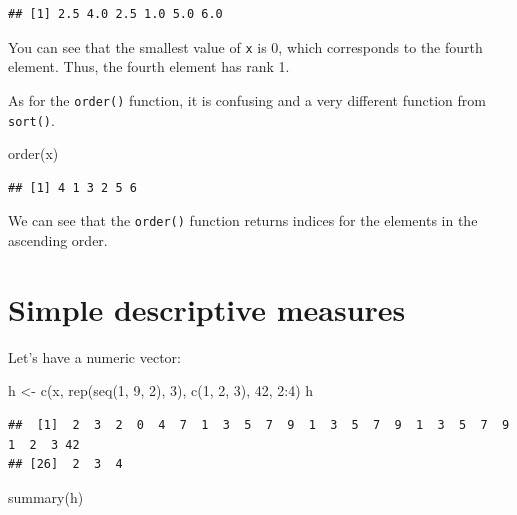 \documentclass[
]{book}
\newenvironment{Shaded}{\begin{snugshade}}{\end{snugshade}}
\newcommand{\DecValTok}[1]{\textcolor[rgb]{0.00,0.00,0.81}{#1}}
\newcommand{\FunctionTok}[1]{\textcolor[rgb]{0.00,0.00,0.00}{#1}}
\newcommand{\NormalTok}[1]{#1}
\newcommand{\OtherTok}[1]{\textcolor[rgb]{0.56,0.35,0.01}{#1}}
\newcommand{\SpecialCharTok}[1]{\textcolor[rgb]{0.00,0.00,0.00}{#1}}
\begin{document}
\begin{verbatim}
## [1] 2.5 4.0 2.5 1.0 5.0 6.0
\end{verbatim}

You can see that the smallest value of \texttt{x} is 0, which corresponds to the fourth element. Thus, the fourth element has rank 1.

As for the \texttt{order()} function, it is confusing and a very different function from \texttt{sort()}.

\begin{Shaded}
\begin{Highlighting}[]
\FunctionTok{order}\NormalTok{(x)}
\end{Highlighting}
\end{Shaded}

\begin{verbatim}
## [1] 4 1 3 2 5 6
\end{verbatim}

We can see that the \texttt{order()} function returns indices for the elements in the ascending order.

\hypertarget{simple-descriptive-measures}{%
\section{Simple descriptive measures}\label{simple-descriptive-measures}}

Let's have a numeric vector:

\begin{Shaded}
\begin{Highlighting}[]
\NormalTok{h }\OtherTok{\textless{}{-}} \FunctionTok{c}\NormalTok{(x, }\FunctionTok{rep}\NormalTok{(}\FunctionTok{seq}\NormalTok{(}\DecValTok{1}\NormalTok{, }\DecValTok{9}\NormalTok{, }\DecValTok{2}\NormalTok{), }\DecValTok{3}\NormalTok{), }\FunctionTok{c}\NormalTok{(}\DecValTok{1}\NormalTok{, }\DecValTok{2}\NormalTok{, }\DecValTok{3}\NormalTok{), }\DecValTok{42}\NormalTok{, }\DecValTok{2}\SpecialCharTok{:}\DecValTok{4}\NormalTok{)}
\NormalTok{h}
\end{Highlighting}
\end{Shaded}

\begin{verbatim}
##  [1]  2  3  2  0  4  7  1  3  5  7  9  1  3  5  7  9  1  3  5  7  9  1  2  3 42
## [26]  2  3  4
\end{verbatim}

\begin{Shaded}
\begin{Highlighting}[]
\FunctionTok{summary}\NormalTok{(h)}
\end{Highlighting}
\end{Shaded}
\end{document}
